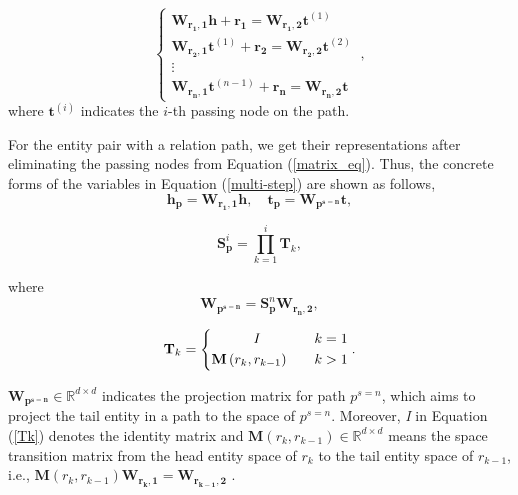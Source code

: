 \documentclass[11pt,a4paper]{article}
\begin{document}
\begin{equation}
\left\{ \begin{matrix}
\mathbf{W}_{\mathbf{r}_{\mathbf{1}}\mathbf{,1}}\mathbf{h} + \mathbf{r}_{\mathbf{1}} = \mathbf{W}_{\mathbf{r}_{\mathbf{1}}\mathbf{,2}}\mathbf{t}^{{(1)}}\mathbf{\text{\ \ \ \ }} \\
\mathbf{W}_{\mathbf{r}_{\mathbf{2}}\mathbf{,1}}\mathbf{t}^{{(1)}} + \mathbf{r}_{\mathbf{2}} = \mathbf{W}_{\mathbf{r}_{\mathbf{2}}\mathbf{,2}}\mathbf{t}^{{(2)}} \\
 \vdots \\
\mathbf{W}_{\mathbf{r}_{\mathbf{n}}\mathbf{,1}}\mathbf{t}^{{(n -
1)}} + \mathbf{r}_{\mathbf{n}} =
\mathbf{W}_{\mathbf{r}_{\mathbf{n}}\mathbf{,2}}\mathbf{t}
\label{matrix_eq}
\end{matrix} \right.\
,
\end{equation}
\newline
where \(\mathbf{t}^{{(i)}}\) indicates the $i$-th passing node on
the path.

For the entity pair with a relation path, we get their
representations after eliminating the passing nodes from Equation
(\ref{matrix_eq}). Thus, the concrete forms of the variables in
Equation (\ref{multi-step}) are shown as follows,
\begin{equation}
\mathbf{h_{p}} =
\mathbf{W}_{\mathbf{r}_{\mathbf{1}}\mathbf{,1}}\mathbf{h}, \quad
\mathbf{t_{p}} =  \mathbf{W}_{\mathbf{p^{s=n}}}\mathbf{t},
\label{hptp}
\end{equation}

\begin{equation}
\mathbf{S}^{i}_{\mathbf{p}} = \prod\limits_{{k =
1}}^{{i}}\mathbf{T}_{{k}},
\end{equation}

where
\begin{equation}
\mathbf{W}_{\mathbf{p^{s=n}}} = \mathbf{S}^{n}_{\mathbf{p}}
\mathbf{W}_{\mathbf{r}_{\mathbf{n}}\mathbf{,2}}, \label{wp}
\end{equation}

\begin{equation}
\mathbf{T}_{k} = \left\{
\begin{aligned}
& \qquad \quad \mathbf{\emph{I}}  & k = 1\\
& \mathbf{M}\left(r_{k}, r_{k-1}\right) \quad & k > 1
\end{aligned}
\right. . \label{Tk}
\end{equation}

$\mathbf{W}_{\mathbf{p^{s=n}}}\mathbf{\in}\mathbb{R}^{{d \times}{d}}$ indicates the projection matrix for
path $p^{s=n}$, which aims to project the tail entity in a path to
the space of $p^{s=n}$. Moreover, \emph{I} in Equation (\ref{Tk})
denotes the identity matrix and $\mathbf{M}\left(r_{k},
r_{k-1}\right)\mathbf{\in}\mathbb{R}^{{d \times}{d}}$ means the space transition matrix from the head
entity space of $r_{k}$ to the tail entity space of $r_{k-1}$, i.e., $\mathbf{M}\left(r_{k}, r_{k-1}\right)  \mathbf{W}_{\mathbf{r}_{\mathbf{k}}\mathbf{,1}} = \mathbf{W}_{\mathbf{r}_{\mathbf{k-1}}\mathbf{,2}}$ .
\end{document}
